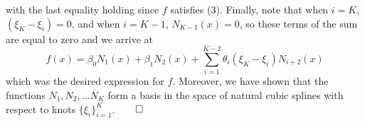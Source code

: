 \documentclass[10pt]{article}
\newcommand{\1}[1]{\mathbbm{1}_{#1}}
\begin{document}
    with the last equality holding since $f$ satisfies (3). Finally, note that when $i=K$, $(\xi_K-\xi_i)=0$, and when $i=K-1$, $N_{K-1}(x)=0$, so these terms of the sum are equal to zero and we arrive at
    \[f(x)=\beta_0N_1(x)+\beta_1N_2(x)+\sum_{i=1}^{K-2}\theta_i(\xi_K-\xi_i)N_{i+2}(x)\]
    which was the desired expression for $f$. Moreover, we have shown that the functions $N_1,N_2,\dots N_K$ form a basis in the space of natural cubic splines with respect to knots $\{\xi_i\}_{i=1}^K$.\hfill{$\qed$}
\end{document}

